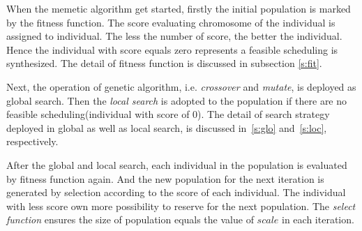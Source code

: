 \documentclass[journal]{IEEEtran}
\newcommand{\calS}{\mathcal{S}}
\theoremstyle{remark}
\begin{document}
When the memetic algorithm get started,
 firstly the initial population is marked by the fitness function.
The score evaluating chromosome of the individual is assigned to individual.
The less the number of score, the better the individual.
Hence the individual with score equals zero represents a feasible scheduling is synthesized.
The detail of fitness function is discussed in subsection \ref{s:fit}.

Next, the operation of genetic algorithm,
 i.e. \emph{crossover} and \emph{mutate},
  is deployed as global search.
Then the \emph{local search} is adopted to the population if there are no feasible scheduling(individual with score of 0).
The detail of search strategy deployed in global as well as local search, is discussed in~\ref{s:glo} and~\ref{s:loc}, respectively.

After the global and local search,
 each individual in the population is evaluated by fitness function again.
And the new population for the next iteration is generated by selection according to the score of each individual.
The individual with less score own more possibility to reserve for the next population.
The \emph{select function} ensures the size of population equals the value of $scale$ in each iteration.

\end{document}
